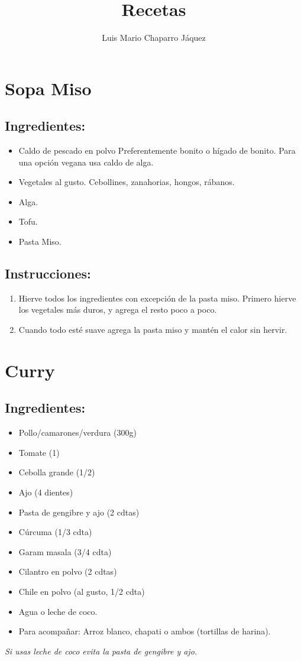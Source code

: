 \documentclass{book}
\title{Recetas}
\author{Luis Mario Chaparro Jáquez}
\begin{document}
\maketitle
\tableofcontents

\newpage
\section{Sopa Miso}
\subsection*{Ingredientes:}
\begin{itemize}
	\item Caldo de pescado en polvo 
		\subitem Preferentemente bonito o hígado de bonito.
		\subitem Para una opción vegana usa caldo de alga.
	\item Vegetales al gusto.
		\subitem Cebollines, zanahorias, hongos, rábanos.
	\item Alga.
	\item Tofu.
	\item Pasta Miso.
\end{itemize}
\subsection*{Instrucciones:}
\begin{enumerate}
	\item Hierve todos los ingredientes con excepción de la pasta miso.
		Primero hierve los vegetales más duros, y agrega el resto poco a poco.
	\item Cuando todo esté suave agrega la pasta miso y mantén el calor sin hervir.
\end{enumerate}

\newpage
\section{Curry}
\subsection*{Ingredientes:}
\begin{itemize}
	\item Pollo/camarones/verdura (300g)
	\item Tomate (1)
	\item Cebolla grande (1/2)
	\item Ajo (4 dientes)
	\item Pasta de gengibre y ajo (2 cdtas)
	\item Cúrcuma (1/3 cdta)
	\item Garam masala (3/4 cdta)
	\item Cilantro en polvo (2 cdtas)
	\item Chile en polvo (al gusto, 1/2 cdta)
	\item Agua o leche de coco.
            \item Para acompañar: Arroz blanco, chapati o ambos (tortillas de harina).
\end{itemize}
\textit{Si usas leche de coco evita la pasta de gengibre y ajo.}
\end{document}

